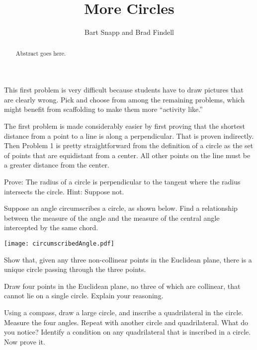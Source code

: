 \documentclass{ximera}
\title{More Circles}
\author{Bart Snapp and Brad Findell}
\begin{document}
\begin{abstract}
Abstract goes here.  
\end{abstract}
\maketitle

\begin{teachingnote}
This first problem is very difficult because students have to draw pictures that are clearly wrong.  Pick and choose from among the remaining problems, which might benefit from scaffolding to make them more ``activity like.''

The first problem is made considerably easier by first proving that the shortest distance from a point to a line is along a perpendicular.  That is proven indirectly.  Then Problem 1 is pretty straightforward from the definition of a circle as the set of points that are equidistant from a center.  All other points on the line must be a greater distance from the center.
\end{teachingnote}

\begin{problem}
Prove: The radius of a circle is perpendicular to the tangent where the radius intersects the circle.  Hint:  Suppose not. 
\end{problem}

\begin{problem}
Suppose an angle circumscribes a circle, as shown below.  Find a relationship between the measure of the angle and the measure of the central angle intercepted by the same chord.
\begin{image}
\texttt{[image: circumscribedAngle.pdf]}
\end{image}
\end{problem}

\begin{problem}
Show that, given any three non-collinear points in the Euclidean
plane, there is a unique circle passing through the three points.
\end{problem}

\begin{problem}
Draw four points in the Euclidean plane, no three of which are collinear, that cannot lie on a single circle.  Explain your reasoning. 
\end{problem}

\begin{problem}
Using a compass, draw a large circle, and inscribe a quadrilateral in the circle.  Measure the four angles.  Repeat with another circle and quadrilateral.  What do you notice?  Identify a condition on any quadrilateral that is inscribed in a circle.  Now prove it.  
\end{problem}
\end{document}
